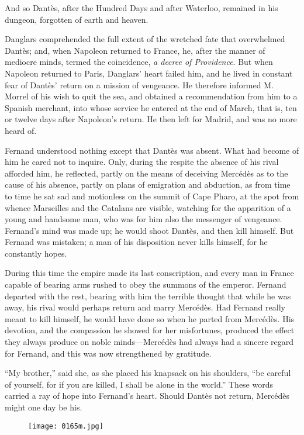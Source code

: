 And so Dantès, after the Hundred Days and after Waterloo, remained in
his dungeon, forgotten of earth and heaven.

Danglars comprehended the full extent of the wretched fate that
overwhelmed Dantès; and, when Napoleon returned to France, he, after
the manner of mediocre minds, termed the coincidence, \textit{a decree of
Providence}. But when Napoleon returned to Paris, Danglars’ heart
failed him, and he lived in constant fear of Dantès’ return on a
mission of vengeance. He therefore informed M. Morrel of his wish to
quit the sea, and obtained a recommendation from him to a Spanish
merchant, into whose service he entered at the end of March, that is,
ten or twelve days after Napoleon’s return. He then left for Madrid,
and was no more heard of.

Fernand understood nothing except that Dantès was absent. What had
become of him he cared not to inquire. Only, during the respite the
absence of his rival afforded him, he reflected, partly on the means of
deceiving Mercédès as to the cause of his absence, partly on plans of
emigration and abduction, as from time to time he sat sad and
motionless on the summit of Cape Pharo, at the spot from whence
Marseilles and the Catalans are visible, watching for the apparition of
a young and handsome man, who was for him also the messenger of
vengeance. Fernand’s mind was made up; he would shoot Dantès, and then
kill himself. But Fernand was mistaken; a man of his disposition never
kills himself, for he constantly hopes.

During this time the empire made its last conscription, and every man
in France capable of bearing arms rushed to obey the summons of the
emperor. Fernand departed with the rest, bearing with him the terrible
thought that while he was away, his rival would perhaps return and
marry Mercédès. Had Fernand really meant to kill himself, he would have
done so when he parted from Mercédès. His devotion, and the compassion
he showed for her misfortunes, produced the effect they always produce
on noble minds—Mercédès had always had a sincere regard for Fernand,
and this was now strengthened by gratitude.

“My brother,” said she, as she placed his knapsack on his shoulders,
“be careful of yourself, for if you are killed, I shall be alone in the
world.” These words carried a ray of hope into Fernand’s heart. Should
Dantès not return, Mercédès might one day be his.

\begin{figure}[ht]
\texttt{[image: 0165m.jpg]}
\end{figure}

